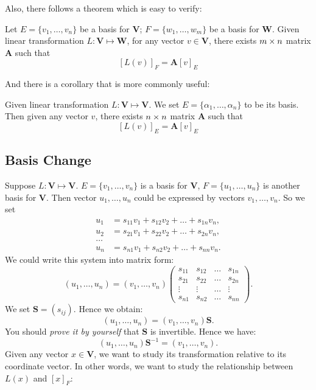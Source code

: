 \newpage
Also, there follows a theorem which is easy to verify:
\begin{theorem}
Let $E=\{v_1,\dots,v_n\}$ be a basis for $\bm V$; $F=\{w_1,\dots,w_m\}$ be a basis for $\bm W$. Given linear transformation $L:\bm V\mapsto \bm W$, for any vector $v\in\bm V$, there exists $m\times n$ matrix $\bm A$ such that
\[
[L(v)]_F=\bm A[v]_E
\]
\end{theorem}
And there is a corollary that is more commonly useful:
\begin{corollary}\label{matrix_representation}
Given linear transformation $L:\bm V\mapsto \bm V$. We set $E = \{\alpha_1,\dots,\alpha_n\}$ to be its basis. Then given any vector $v$, there exists $n\times n$ matrix $\bm A$ such that
\[
[L(v)]_{E}=\bm A[v]_{E}
\]
\end{corollary}
\subsection{Basis Change}
Suppose $L:\bm V\mapsto \bm V$. $E=\{v_1,\dots,v_n\}$ is a basis for $\bm V$, $F=\{u_1,\dots,u_n\}$ is another basis for $\bm V$. Then vector $u_1,\dots,u_n$ could be expressed by vectors $v_1,\dots,v_n$. So we set
\[
\begin{aligned}
u_1&=s_{11}v_1+s_{12}v_2+\dots+s_{1n}v_n,\\
u_2&=s_{21}v_1+s_{22}v_2+\dots+s_{2n}v_n,\\
\dots\\
u_n&=s_{n1}v_1+s_{n2}v_2+\dots+s_{nn}v_n.
\end{aligned}
\]
We could write this system into matrix form:
\[
(u_1,\dots,u_n)=(v_1,\dots,v_n)\begin{pmatrix}
s_{11}&s_{12}&\dots&s_{1n}\\
s_{21}&s_{22}&\dots&s_{2n}\\
\vdots&\vdots&\dots&\vdots\\
s_{n1}&s_{n2}&\dots&s_{nn}
\end{pmatrix}.
\]
We set $\bm S=(s_{ij})$. Hence we obtain:
\begin{equation}\label{basis_change_formula}
(u_1,\dots,u_n)=(v_1,\dots,v_n)\bm S.
\end{equation}
You should \emph{prove it by yourself} that $\bm S$ is invertible. Hence we have:
\begin{equation}\label{basis_change_formula_inverse}
(u_1,\dots,u_n)\bm S^{-1}=(v_1,\dots,v_n).
\end{equation}
Given any vector $x\in\bm V$, we want to study its transformation relative to its coordinate vector. In other words, we want to study the relationship between $L(x)$ and $[x]_{F}$:
